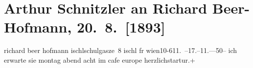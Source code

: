 

         
         \renewcommand{\erwaehntePersonen}{Personen: Richard Beer-Hofmann}
         \renewcommand{\erwaehnteOrte}{Orte: Bad Ischl, Café de l’Europe, Schulgasse, Wien}
         \renewcommand{\erwaehnteWerke}{}
               \section[Arthur Schnitzler an Richard Beer-Hofmann, 20. 8. {[}1893{]}]{ Arthur Schnitzler an Richard Beer-Hofmann, 20. 8. {[}1893{]}}\nopagebreak{}\rehead{ }\begin{ledgroupsized}[t]{13cm}\normalsize\beginnumbering \toendnotes[C]{\smallbreak\pagebreak[2]} 
\pstart{}{\pb}richard beer hofmann ischl\pend{}\pstart{}schulgasze 8\pend{}{\bigskip}\pstart
           \noindent{}{\pb}ischl fr{ }wien10-611. –17.–11.—50–\pend
           \pstart
           ich erwarte sie montag{ }abend acht im cafe europe\pend
           \pstart herzlichst\spacefill\mbox{artur.+}\pend{}
         
         \endnumbering{}\end{ledgroupsized}  \newcommand{\dateiname}{L00258}\newcommand{\titel}{Arthur Schnitzler an Richard Beer-Hofmann, 20. 8. [1893]}\newcommand{\editorInnen}{Martin Anton Müller und Gerd-Hermann Susen}
      